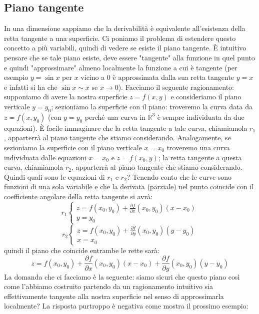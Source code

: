 \documentclass[a4paper]{article}
\numberwithin{equation}{subsection}
\begin{document}
\subsection{Piano tangente}

In una dimensione sappiamo che la derivabilità è equivalente all'esistenza della retta tangente a una superficie. 
Ci poniamo il problema di estendere questo concetto a più variabili, quindi di vedere se esiste il piano tangente. È intuitivo pensare che se tale piano esiste,
deve essere "tangente" alla funzione in quel punto e quindi "approssimare" almeno localmente la funzione a cui è tangente (per esempio $y = \sin{x}$ per $x$ vicino a 0 è approssimata dalla sua retta tangente $y=x$ e infatti si ha che $\sin{x} \sim x$ se $x \rightarrow 0$).
Facciamo il seguente ragionamento: supponiamo di avere la nostra superficie $z = f(x,y)$ e consideriamo il piano verticale $y = y_0$; sezioniamo la superficie con il piano: troveremo la curva data da $z = f(x,y_0)$ (con $y = y_0$ perché una curva in $\mathbb{R}^3$ è sempre individuata da due equazioni). 
È facile immaginare che la retta tangente a tale curva, chiamiamola $r_1$, apparterrà al piano tangente che stiamo considerando. Analogamente,
se sezioniamo la superficie con il piano verticale $x = x_0$ troveremo una curva individuata dalle equazioni $x = x_0$ e $z = f(x_0,y)$; la retta tangente a questa curva, chiamiamola $r_2$, apparterrà al piano tangente che stiamo considerando.
Quindi quali sono le equazioni di $r_1$ e $r_2$? Tenendo conto che le curve sono funzioni di una sola variabile e che la derivata (parziale) nel punto coincide 
con il coefficiente angolare della retta tangente si avrà:
\[
r_1 \begin{cases}
    z = f(x_0,y_0) + \frac{\partial f}{\partial x}(x_0,y_0)(x - x_0)\\
    y = y_0
\end{cases}
\]
\[
r_2 \begin{cases}
    z = f(x_0,y_0) + \frac{\partial f}{\partial y}(x_0,y_0)(y - y_0)\\
    x = x_0
    \end{cases}
\]
quindi il piano che coincide entrambe le rette sarà:
\begin{equation}
    z = f(x_0,y_0) + \frac{\partial f}{\partial x}(x_0,y_0)(x - x_0) + \frac{\partial f}{\partial y}(x_0,y_0)(y - y_0)
\end{equation}
La domanda che ci facciamo è la seguente: siamo sicuri che questo piano così come l'abbiamo costruito partendo da un ragionamento intuitivo 
sia effettivamente tangente alla nostra superficie nel senso di approssimarla localmente? La risposta purtroppo è negativa come mostra il prossimo esempio:
\end{document}
